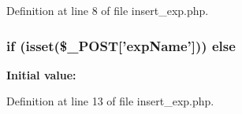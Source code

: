Definition at line 8 of file insert\-\_\-exp.\-php.

\hypertarget{insert__exp_8php_a52448dd09a6db2ed5bf840e135b80fbe}{
\subsubsection[{else}]{\setlength{\rightskip}{0pt plus 5cm}if (isset(\$\-\_\-\-P\-O\-S\-T\mbox{[}'exp\-Name'\mbox{]})) else}}\label{insert__exp_8php_a52448dd09a6db2ed5bf840e135b80fbe}
{\bfseries Initial value\-:}


Definition at line 13 of file insert\-\_\-exp.\-php.

